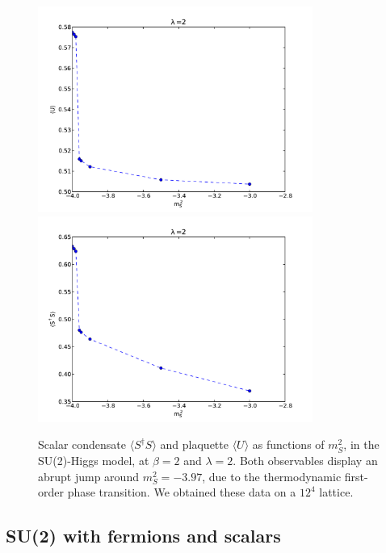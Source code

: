 \begin{figure}[thb] 
\begin{adjustwidth}{-4em}{-4em}
  \includegraphics[width=9cm,clip]{pics/SU2H_jump_plaquette}\includegraphics[width=9cm,clip]{pics/SU2H_jump_condensate}
\end{adjustwidth}
  \caption{Scalar condensate $\langle S^{\dagger}S \rangle$ and plaquette $\langle U \rangle$ as functions of $m_S^2$, in the SU(2)-Higgs model, at $\beta =2$ and $\lambda = 2$. Both observables display an abrupt jump around $m_S^2 = -3.97$, due to the thermodynamic first-order phase transition. We obtained these data on a $12^4$ lattice.}
  \label{SU2H_jump_pl_cond}
\end{figure}



\subsection{SU(2) with fermions and scalars}

